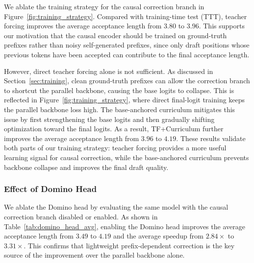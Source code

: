 We ablate the training strategy for the causal correction branch in Figure~\ref{fig:training_strategy}. Compared with training-time test (TTT), teacher forcing improves the average acceptance length from \(3.80\) to \(3.96\). This supports our motivation that the causal encoder should be trained on ground-truth prefixes rather than noisy self-generated prefixes, since only draft positions whose previous tokens have been accepted can contribute to the final acceptance length.

However, direct teacher forcing alone is not sufficient. As discussed in Section~\ref{sec:training}, clean ground-truth prefixes can allow the correction branch to shortcut the parallel backbone, causing the base logits to collapse. This is reflected in Figure~\ref{fig:training_strategy}, where direct final-logit training keeps the parallel backbone loss high. The base-anchored curriculum mitigates this issue by first strengthening the base logits and then gradually shifting optimization toward the final logits. As a result, TF+Curriculum further improves the average acceptance length from \(3.96\) to \(4.19\). These results validate both parts of our training strategy: teacher forcing provides a more useful learning signal for causal correction, while the base-anchored curriculum prevents backbone collapse and improves the final draft quality.


\subsubsection{Effect of Domino Head}

We ablate the Domino head by evaluating the same model with the causal correction branch disabled or enabled. As shown in Table~\ref{tab:domino_head_avg}, enabling the Domino head improves the average acceptance length from \(3.49\) to \(4.19\) and the average speedup from \(2.84\times\) to \(3.31\times\). This confirms that lightweight prefix-dependent correction is the key source of the improvement over the parallel backbone alone.



 